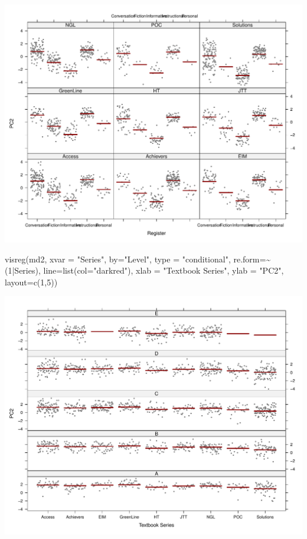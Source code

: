 \documentclass[
  letterpaper,
  DIV=11,
  numbers=noendperiod]{scrreprt}
\newenvironment{Shaded}{\begin{snugshade}}{\end{snugshade}}
\newcommand{\AttributeTok}[1]{\textcolor[rgb]{0.40,0.45,0.13}{#1}}
\newcommand{\DecValTok}[1]{\textcolor[rgb]{0.68,0.00,0.00}{#1}}
\newcommand{\FunctionTok}[1]{\textcolor[rgb]{0.28,0.35,0.67}{#1}}
\newcommand{\NormalTok}[1]{\textcolor[rgb]{0.00,0.23,0.31}{#1}}
\newcommand{\SpecialCharTok}[1]{\textcolor[rgb]{0.37,0.37,0.37}{#1}}
\newcommand{\StringTok}[1]{\textcolor[rgb]{0.13,0.47,0.30}{#1}}
\begin{document}
\includegraphics{E_Ch6_Analysis_files/figure-pdf/Dim2estimateplots-2.pdf}

\begin{Shaded}
\begin{Highlighting}[]
\FunctionTok{visreg}\NormalTok{(md2, }\AttributeTok{xvar =} \StringTok{"Series"}\NormalTok{, }\AttributeTok{by=}\StringTok{"Level"}\NormalTok{, }\AttributeTok{type =} \StringTok{"conditional"}\NormalTok{, }\AttributeTok{re.form=}\SpecialCharTok{\textasciitilde{}}\NormalTok{(}\DecValTok{1}\SpecialCharTok{|}\NormalTok{Series), }
       \AttributeTok{line=}\FunctionTok{list}\NormalTok{(}\AttributeTok{col=}\StringTok{"darkred"}\NormalTok{), }\AttributeTok{xlab =} \StringTok{"Textbook Series"}\NormalTok{, }\AttributeTok{ylab =} \StringTok{"PC2"}\NormalTok{,}
       \AttributeTok{layout=}\FunctionTok{c}\NormalTok{(}\DecValTok{1}\NormalTok{,}\DecValTok{5}\NormalTok{))}
\end{Highlighting}
\end{Shaded}

\includegraphics{E_Ch6_Analysis_files/figure-pdf/Dim2estimateplots-3.pdf}
\end{document}
